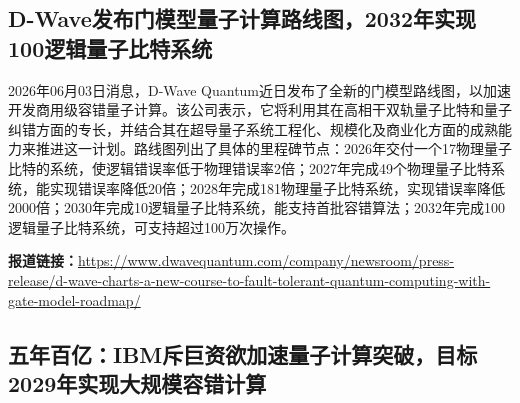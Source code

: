 \documentclass[12pt,a4paper]{ctexart}
\begin{document}
\subsection{ D-Wave发布门模型量子计算路线图，2032年实现100逻辑量子比特系统 }

2026年06月03日消息，D-Wave Quantum近日发布了全新的门模型路线图，以加速开发商用级容错量子计算。该公司表示，它将利用其在高相干双轨量子比特和量子纠错方面的专长，并结合其在超导量子系统工程化、规模化及商业化方面的成熟能力来推进这一计划。路线图列出了具体的里程碑节点：2026年交付一个17物理量子比特的系统，使逻辑错误率低于物理错误率2倍；2027年完成49个物理量子比特系统，能实现错误率降低20倍；2028年完成181物理量子比特系统，实现错误率降低2000倍；2030年完成10逻辑量子比特系统，能支持首批容错算法；2032年完成100逻辑量子比特系统，可支持超过100万次操作。

\noindent\textbf{报道链接：}\url{https://www.dwavequantum.com/company/newsroom/press-release/d-wave-charts-a-new-course-to-fault-tolerant-quantum-computing-with-gate-model-roadmap/}

\subsection{ 五年百亿：IBM斥巨资欲加速量子计算突破，目标2029年实现大规模容错计算 }
\end{document}
